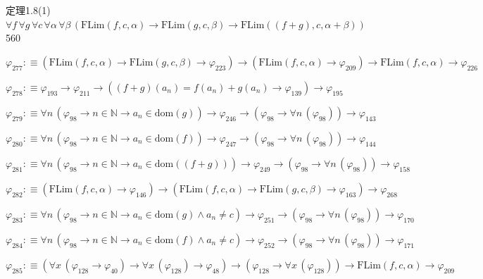 \begin{fullproof}{定理1.8(1)}{$\forall f\,\forall g\,\forall c\,\forall \alpha\,\forall \beta\,(\mathrm{FLim}(f,c,\alpha) \to \mathrm{FLim}(g,c,\beta) \to \mathrm{FLim}((f + g),c,\alpha + \beta))$}{560}
\begin{abbrevlist}
\item $\varphi_{277} :\equiv (\mathrm{FLim}(f,c,\alpha) \to \mathrm{FLim}(g,c,\beta) \to \varphi_{223}) \to (\mathrm{FLim}(f,c,\alpha) \to \varphi_{209}) \to \mathrm{FLim}(f,c,\alpha) \to \varphi_{226}$
\item $\varphi_{278} :\equiv \varphi_{193} \to \varphi_{211} \to ((f + g)(a_{n}) = f(a_{n}) + g(a_{n}) \to \varphi_{139}) \to \varphi_{195}$
\item $\varphi_{279} :\equiv \forall n\,(\varphi_{98} \to n \in \mathbb{N} \to a_{n} \in \mathrm{dom}(g)) \to \varphi_{246} \to (\varphi_{98} \to \forall n\,(\varphi_{98})) \to \varphi_{143}$
\item $\varphi_{280} :\equiv \forall n\,(\varphi_{98} \to n \in \mathbb{N} \to a_{n} \in \mathrm{dom}(f)) \to \varphi_{247} \to (\varphi_{98} \to \forall n\,(\varphi_{98})) \to \varphi_{144}$
\item $\varphi_{281} :\equiv \forall n\,(\varphi_{98} \to n \in \mathbb{N} \to a_{n} \in \mathrm{dom}((f + g))) \to \varphi_{249} \to (\varphi_{98} \to \forall n\,(\varphi_{98})) \to \varphi_{158}$
\item $\varphi_{282} :\equiv (\mathrm{FLim}(f,c,\alpha) \to \varphi_{146}) \to (\mathrm{FLim}(f,c,\alpha) \to \mathrm{FLim}(g,c,\beta) \to \varphi_{163}) \to \varphi_{268}$
\item $\varphi_{283} :\equiv \forall n\,(\varphi_{98} \to n \in \mathbb{N} \to a_{n} \in \mathrm{dom}(g) \land a_{n} \neq c) \to \varphi_{251} \to (\varphi_{98} \to \forall n\,(\varphi_{98})) \to \varphi_{170}$
\item $\varphi_{284} :\equiv \forall n\,(\varphi_{98} \to n \in \mathbb{N} \to a_{n} \in \mathrm{dom}(f) \land a_{n} \neq c) \to \varphi_{252} \to (\varphi_{98} \to \forall n\,(\varphi_{98})) \to \varphi_{171}$
\item $\varphi_{285} :\equiv (\forall x\,(\varphi_{128} \to \varphi_{40}) \to \forall x\,(\varphi_{128}) \to \varphi_{48}) \to (\varphi_{128} \to \forall x\,(\varphi_{128})) \to \mathrm{FLim}(f,c,\alpha) \to \varphi_{209}$
\end{abbrevlist}
\end{fullproof}

